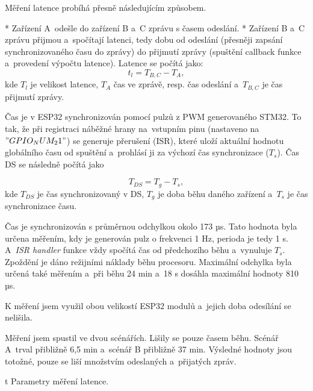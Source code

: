 Měření latence probíhá přesně následujícím způsobem.

\begitems
* Zařízení A~odešle do zařízení B a~C zprávu s časem odeslání.
* Zařízení B a~C zprávu přijmou a~spočítají latenci, tedy dobu od odeslání (přesněji zapsání synchronizovaného času do zprávy) do přijmutí zprávy (spuštění callback funkce a~provedení výpočtu latence). Latence se počítá jako:
$$
t_l = T_{B,C} - T_A,
$$
kde $T_l$ je velikost latence, $T_A$ čas ve zprávě, resp. čas odeslání a~$T_{B,C}$ je čas přijmutí zprávy.
\enditems

Čas je v ESP32 synchronizován pomocí pulzů z PWM generovaného STM32. To tak, že při registraci náběžné hrany na~vstupním pinu (nastaveno na~$"GPIO_NUM_21"$) se generuje přerušení (ISR), které uloží aktuální hodnotu globálního času od spuštění a~prohlásí ji za výchozí čas synchronizace ($T_s$). Čas DS se následně počítá jako

$$
T_{DS} = T_g - T_s,
$$
kde $T_{DS}$ je čas synchronizovaný v DS, $T_g$ je doba běhu daného zařízení a~$T_s$ je čas synchronizace času.

Čas je synchronizován s průměrnou odchylkou okolo 173 µs. Tato hodnota byla určena měřením, kdy je generován pulz o frekvenci 1 Hz, perioda je tedy 1 s. A~{\em ISR handler} funkce vždy spočítá čas od předchozího běhu a~vynuluje $T_s$. Zpoždění je dáno režijními náklady běhu procesoru. Maximální odchylka byla určená také měřením a~při běhu 24 min a~18 s dosáhla maximální hodnoty 810 µs.

K měření jsem využil obou velikostí ESP32 modulů a~jejich doba odesílání se nelišila.

Měření jsem spustil ve dvou scénářích. Lišily se pouze časem běhu. Scénář A~trval přibližně 6,5 min a~scénář B přibližně 37 min. Výsledné hodnoty jsou totožné, pouze se liší množstvím odeslaných a~přijatých zpráv.

\midinsert {}
\caption/t Parametry měření latence.
\endinsert

